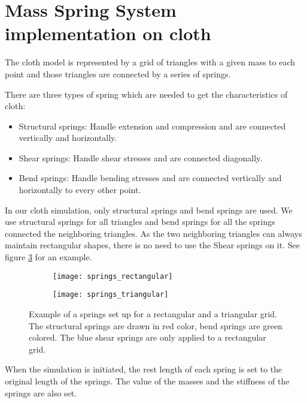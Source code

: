 \section{Mass Spring System implementation on cloth}
The cloth model is represented by a grid of triangles with a given mass to each point and those triangles are connected by a series of springs.\par

There are three types of spring which are needed to get the characteristics of cloth: 
\begin{itemize}
	\item Structural springs: Handle extension and compression and are connected vertically and horizontally. 
	\item Shear springs: Handle shear stresses and are connected diagonally. 
	\item Bend springs: Handle bending stresses and are connected vertically and horizontally to every other point. 
\end{itemize}

In our cloth simulation, only structural springs and bend springs are used. We use structural springs for all triangles and bend springs for all the springs connected the neighboring triangles. As the two neighboring triangles can always maintain rectangular shapes, there is no need to use the Shear springs on it. See figure \ref{fig:springs} for an example.\par
\begin{figure}[h]
	\centering
	\begin{subfigure}{0.4\textwidth}
		\centering
		\texttt{[image: springs\_rectangular]}
		\label{fig:springs_rect}
	\end{subfigure}
	\quad
	\begin{subfigure}{0.4\textwidth}
		\centering
		\texttt{[image: springs\_triangular]}
		\label{fig:springs_triang}
	\end{subfigure}
	\caption{Example of a springs set up for a rectangular and a triangular grid. The structural springs are drawn in red color, bend springs are green colored. The blue shear springs are only applied to a rectangular grid.}
	\label{fig:springs}
\end{figure}

When the simulation is initiated, the rest length of each spring is set to the original length of the springs. The value of the masses and the stiffness of the springs are also set.\par

